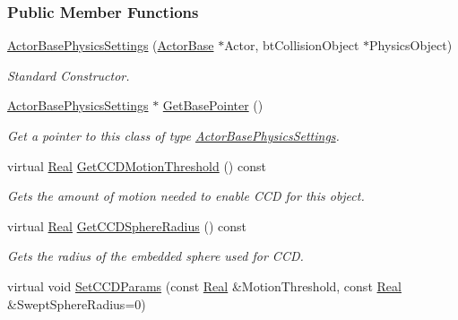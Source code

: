\subsubsection*{Public Member Functions}
\begin{DoxyCompactItemize}
\item 
\hyperlink{classMezzanine_1_1ActorBasePhysicsSettings_a3f8d93a77d1d9a61314ef350a1c3394a}{ActorBasePhysicsSettings} (\hyperlink{classMezzanine_1_1ActorBase}{ActorBase} $\ast$Actor, btCollisionObject $\ast$PhysicsObject)
\begin{DoxyCompactList}\small\item\em Standard Constructor. \item\end{DoxyCompactList}\item 
\hyperlink{classMezzanine_1_1ActorBasePhysicsSettings}{ActorBasePhysicsSettings} $\ast$ \hyperlink{classMezzanine_1_1ActorBasePhysicsSettings_ae43e2938e30b69ac11627b9648c43415}{GetBasePointer} ()
\begin{DoxyCompactList}\small\item\em Get a pointer to this class of type \hyperlink{classMezzanine_1_1ActorBasePhysicsSettings}{ActorBasePhysicsSettings}. \item\end{DoxyCompactList}\item 
virtual \hyperlink{namespaceMezzanine_a726731b1a7df72bf3583e4a97282c6f6}{Real} \hyperlink{classMezzanine_1_1ActorBasePhysicsSettings_a804941eb77d960dd3c73d331c47c891c}{GetCCDMotionThreshold} () const 
\begin{DoxyCompactList}\small\item\em Gets the amount of motion needed to enable CCD for this object. \item\end{DoxyCompactList}\item 
virtual \hyperlink{namespaceMezzanine_a726731b1a7df72bf3583e4a97282c6f6}{Real} \hyperlink{classMezzanine_1_1ActorBasePhysicsSettings_a3729e8ee88bc2d8892d921016aa4a4c0}{GetCCDSphereRadius} () const 
\begin{DoxyCompactList}\small\item\em Gets the radius of the embedded sphere used for CCD. \item\end{DoxyCompactList}\item 
virtual void \hyperlink{classMezzanine_1_1ActorBasePhysicsSettings_a702a20cfb7d87dbc2a7d44ba9260ead2}{SetCCDParams} (const \hyperlink{namespaceMezzanine_a726731b1a7df72bf3583e4a97282c6f6}{Real} \&MotionThreshold, const \hyperlink{namespaceMezzanine_a726731b1a7df72bf3583e4a97282c6f6}{Real} \&SweptSphereRadius=0)

\end{DoxyCompactItemize}
